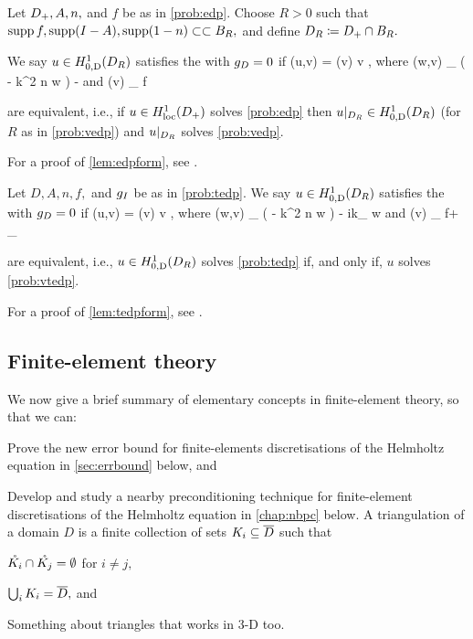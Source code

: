 \bprob[Variational formulation of EDP when $\gD = 0$]\label{prob:vedp}
Let $D_{+}, A, n,$ and $f$ be as in \cref{prob:edp}. Choose $R>0$ such that $\operatorname{supp} f, \operatorname{supp}(I-A), \operatorname{supp}(1-n) \subset\subset B_{R},$ and define $D_{R} \coloneqq D_{+} \cap B_{R}.$

We say $u \in \HozDDR$ satisfies the  with $\gD = 0$ if
\beqs
\aE(u,v) = \FE(v) \tfa v \in \HozDDR,
\eeqs
where
\beqs
\aE(w,v) \de \int_{\DR} \mleft( - k^2 n w \vbar\mright) - 
\eeqs
and
\beqs
\FE(v) \de \int_{\DR} f\vbar
\eeqs
\eprob

\label{lem:edpform}
 are equivalent, i.e., if $u \in \HolocDp$ solves \cref{prob:edp} then $u\restrict_{\DR} \in \HozDDR$ (for $R$ as in \cref{prob:vedp}) and $u|_{D_{R}}$ solves \cref{prob:vedp}.
\ele

For a proof of \cref{lem:edpform}, see \cite[Lemma 3.3]{GrPeSp:19}.

\bprob[Variational formulation of TEDP when $\gD = 0$]\label{prob:vtedp}
Let $D, A, n, f,$ and $g_{I}$ be as in \cref{prob:tedp}. We say $u \in \HozDDR$ satisfies the  with $\gD = 0$ if
\beqs
\aT(u,v) = \FT(v) \tfa v \in \HozDDR,
\eeqs
where
\beqs
\aT(w,v) \de \int_{\DR} \mleft( - k^2 n w \vbar\mright) - ik\int_{\GI} \trGI w\trGI \vbar
\eeqs
and
\beqs
\FT(v) \de \int_{\DR} f\vbar + \int_{\GI} \gI \trGI \vbar
\eeqs
\eprob
{}

\label{lem:tedpform}
 are equivalent, i.e., $u \in \HozDDR$ solves \cref{prob:tedp} if, and only if, $u$ solves \cref{prob:vtedp}.
\ele

For a proof of \cref{lem:tedpform}, see \cite[Lemma A.7]{GrPeSp:19}.
  
\subsection{Finite-element theory}\label{sec:fetheory}

We now give a brief summary of elementary concepts in finite-element theory, so that we can:
\ben
\item Prove the new error bound for finite-elements discretisations of the Helmholtz equation in \cref{sec:errbound} below, and
  \item Develop and study a nearby preconditioning technique for finite-element discretisations of the Helmholtz equation in \cref{chap:nbpc} below.
\een
    \bde[Triangulation]
    A triangulation of a  domain $D$ is a finite collection of sets $K_{i} \subseteq \overline{D}$ such that
    \ben
  \item $\mathring{K_{i}} \cap \mathring{K_{j}} = \emptyset$ for $ i \neq j,$
  \item $\bigcup_i K_{i} = \overline{D},$ and
    \item Something about triangles that works in 3-D too.
    \een
    \ede


